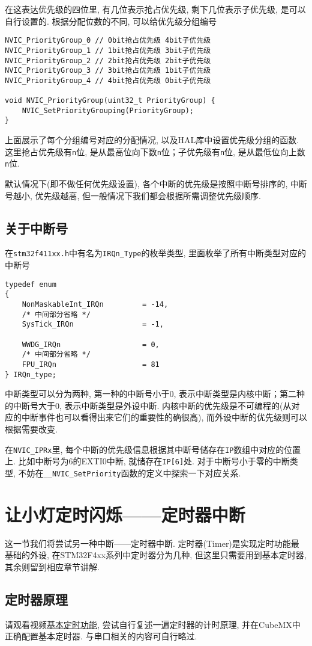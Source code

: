 在这表达优先级的四位里, 有几位表示抢占优先级, 剩下几位表示子优先级, 是可以自行设置的. 根据分配位数的不同, 可以给优先级分组编号
\begin{lstlisting}
NVIC_PriorityGroup_0 // 0bit抢占优先级 4bit子优先级
NVIC_PriorityGroup_1 // 1bit抢占优先级 3bit子优先级
NVIC_PriorityGroup_2 // 2bit抢占优先级 2bit子优先级
NVIC_PriorityGroup_3 // 3bit抢占优先级 1bit子优先级
NVIC_PriorityGroup_4 // 4bit抢占优先级 0bit子优先级

void NVIC_PriorityGroup(uint32_t PriorityGroup) {
    NVIC_SetPriorityGrouping(PriorityGroup);
}
\end{lstlisting}
上面展示了每个分组编号对应的分配情况, 以及HAL库中设置优先级分组的函数. 这里抢占优先级有\verb|n|位, 是从最高位向下数\verb|n|位；子优先级有\verb|n|位, 是从最低位向上数\verb|n|位.

默认情况下(即不做任何优先级设置), 各个中断的优先级是按照中断号排序的, 中断号越小, 优先级越高, 但一般情况下我们都会根据所需调整优先级顺序.
\subsection{关于中断号}
在\verb|stm32f411xx.h|中有名为\verb|IRQn_Type|的枚举类型, 里面枚举了所有中断类型对应的中断号
\begin{lstlisting}
typedef enum
{
    NonMaskableInt_IRQn         = -14,
    /* 中间部分省略 */
    SysTick_IRQn                = -1,

    WWDG_IRQn                   = 0,
    /* 中间部分省略 */
    FPU_IRQn                    = 81
} IRQn_type;
\end{lstlisting}
中断类型可以分为两种, 第一种的中断号小于0, 表示中断类型是内核中断；第二种的中断号大于0, 表示中断类型是外设中断. 内核中断的优先级是不可编程的(从对应的中断事件也可以看得出来它们的重要性的确很高),
而外设中断的优先级则可以根据需要改变.

在\verb|NVIC_IPRx|里, 每个中断的优先级信息根据其中断号储存在\verb|IP|数组中对应的位置上. 比如中断号为6的EXTI0中断, 就储存在\verb|IP[6]|处.
对于中断号小于零的中断类型, 不妨在\verb|__NVIC_SetPriority|函数的定义中探索一下对应关系.

\section{让小灯定时闪烁——定时器中断}
这一节我们将尝试另一种中断——定时器中断. 定时器(Timer)是实现定时功能最基础的外设, 在STM32F4xx系列中定时器分为几种, 但这里只需要用到基本定时器, 其余则留到相应章节讲解.
\subsection{定时器原理}
请观看视频\href{https://www.bilibili.com/video/BV11u4y1A7gS/?share_source=copy_web&vd_source=00b9d329964a93c9843f9c524074f948}{基本定时功能}, 尝试自行复述一遍定时器的计时原理, 并在CubeMX中正确配置基本定时器.
与串口相关的内容可自行略过.
